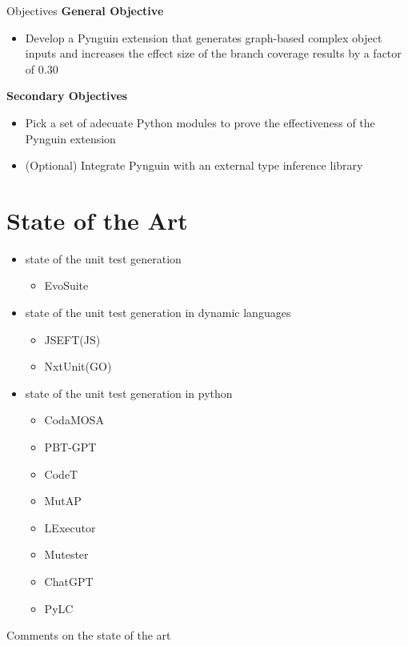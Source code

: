 \documentclass[%
  chapterprefix=false,%
  open=right,%
  twoside=true,%
  paper=a4,%
  logofile={Figures/logo.png},%
  thesistype=master,%
  UKenglish,%
]{se2thesis}
\begin{document}
\begin{summary}{Objectives}
\centering\textbf{General Objective}
\begin{itemize}
\item  Develop a Pynguin extension that generates graph-based complex object inputs and increases the effect size of the branch coverage results by a factor of $0.30$
\end{itemize}
\centering\textbf{Secondary Objectives}
\begin{itemize}
\item  Pick a set of adecuate Python modules to prove the effectiveness of the Pynguin extension
\item (Optional) Integrate Pynguin with an external type inference library
\end{itemize}
\end{summary}

\chapter{State of the Art}

\begin{itemize}
  \item state of the unit test generation
  \begin{itemize}
    \item EvoSuite~\cite{DBLP:conf/sigsoft/FraserA11}
  \end{itemize}
  \item state of the unit test generation in dynamic languages
  \begin{itemize}
    \item JSEFT(JS)~\cite{DBLP:conf/icst/Mirshokraie0P15}
    \item NxtUnit(GO)~\cite{DBLP:conf/ease/WangMCGSP23}
  \end{itemize}
  \item state of the unit test generation in python
  \begin{itemize}
    \item CodaMOSA~\cite{DBLP:conf/icse/LemieuxILS23}
    \item PBT-GPT~\cite{DBLP:journals/corr/abs-2307-04346}
    \item CodeT~\cite{DBLP:journals/corr/abs-2207-10397}
    \item MutAP~\cite{DBLP:journals/corr/abs-2308-16557}
    \item LExecutor~\cite{DBLP:journals/corr/abs-2302-02343}
    \item Mutester~\cite{DBLP:journals/corr/abs-2307-00404}
    \item ChatGPT~\cite{li2023nuances}
    \item PyLC~\cite{DBLP:conf/sac/SalariEAS23}
  \end{itemize}
\end{itemize}

Comments on the state of the art

\backmatter{}

\printbibliography{}
\end{document}

